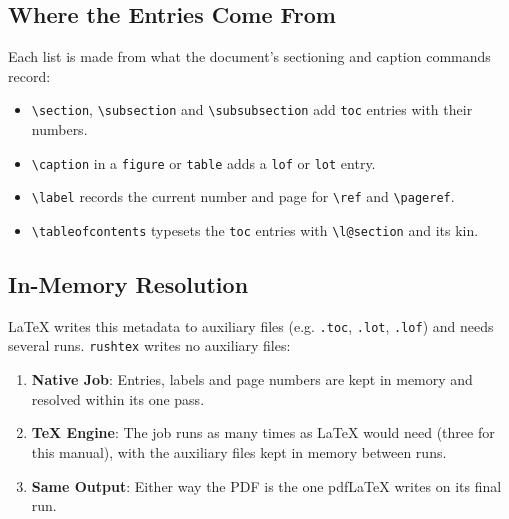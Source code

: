 \documentclass[11pt, a4paper]{article}
\begin{document}
\subsection{Where the Entries Come From}
Each list is made from what the document's sectioning and caption commands record:
\begin{itemize}
\item \verb|\section|, \verb|\subsection| and \verb|\subsubsection| add \texttt{toc} entries with their numbers.
\item \verb|\caption| in a \texttt{figure} or \texttt{table} adds a \texttt{lof} or \texttt{lot} entry.
\item \verb|\label| records the current number and page for \verb|\ref| and \verb|\pageref|.
\item \verb|\tableofcontents| typesets the \texttt{toc} entries with \verb|\l@section| and its kin.
\end{itemize}

\subsection{In-Memory Resolution}
LaTeX writes this metadata to auxiliary files (e.g. \texttt{.toc}, \texttt{.lot}, \texttt{.lof}) and needs several runs. \texttt{rushtex} writes no auxiliary files:
\begin{enumerate}
\item \textbf{Native Job}: Entries, labels and page numbers are kept in memory and resolved within its one pass.
\item \textbf{TeX Engine}: The job runs as many times as LaTeX would need (three for this manual), with the auxiliary files kept in memory between runs.
\item \textbf{Same Output}: Either way the PDF is the one pdfLaTeX writes on its final run.
\end{enumerate}
\end{document}
